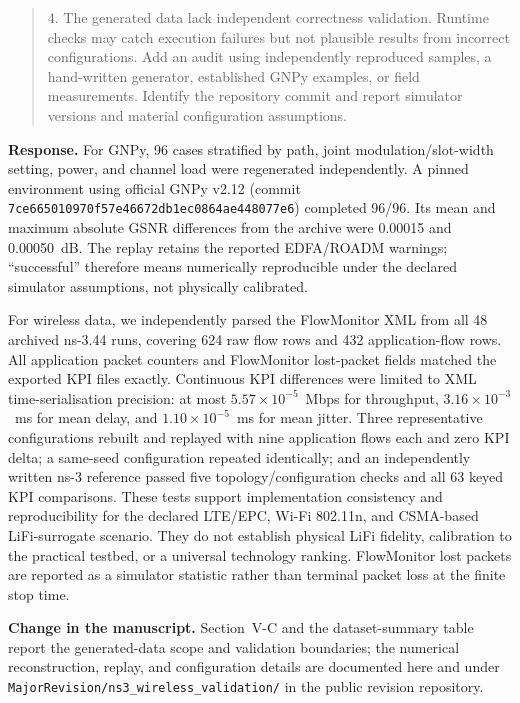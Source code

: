 \documentclass[11pt]{article}
\newenvironment{reviewercomment}{\begin{quote}\color{reviewblue}}{\end{quote}}
\newenvironment{authorresponse}{\color{responsegreen}\textbf{Response.} }{\par\color{black}}
\newcommand{\change}[1]{\par\textbf{Change in the manuscript.} #1\par}
\begin{document}
\begin{reviewercomment}
4. The generated data lack independent correctness validation. Runtime checks may catch execution failures but not plausible results from incorrect configurations. Add an audit using independently reproduced samples, a hand-written generator, established GNPy examples, or field measurements. Identify the repository commit and report simulator versions and material configuration assumptions.
\end{reviewercomment}
\begin{authorresponse}
For GNPy, 96 cases stratified by path, joint modulation/slot-width setting, power, and channel load were regenerated independently. A pinned environment using official GNPy v2.12 (commit \texttt{7ce66501\allowbreak{}0970f57e\allowbreak{}46672db1\allowbreak{}ec0864ae\allowbreak{}448077e6}) completed 96/96. Its mean and maximum absolute GSNR differences from the archive were 0.00015 and 0.00050~dB. The replay retains the reported EDFA/ROADM warnings; ``successful'' therefore means numerically reproducible under the declared simulator assumptions, not physically calibrated.

For wireless data, we independently parsed the FlowMonitor XML from all 48 archived ns-3.44 runs, covering 624 raw flow rows and 432 application-flow rows. All application packet counters and FlowMonitor lost-packet fields matched the exported KPI files exactly. Continuous KPI differences were limited to XML time-serialisation precision: at most $5.57\times10^{-5}$~Mbps for throughput, $3.16\times10^{-3}$~ms for mean delay, and $1.10\times10^{-5}$~ms for mean jitter. Three representative configurations rebuilt and replayed with nine application flows each and zero KPI delta; a same-seed configuration repeated identically; and an independently written ns-3 reference passed five topology/configuration checks and all 63 keyed KPI comparisons. These tests support implementation consistency and reproducibility for the declared LTE/EPC, Wi-Fi 802.11n, and CSMA-based LiFi-surrogate scenario. They do not establish physical LiFi fidelity, calibration to the practical testbed, or a universal technology ranking. FlowMonitor lost packets are reported as a simulator statistic rather than terminal packet loss at the finite stop time.
\end{authorresponse}
\change{Section~V-C and the dataset-summary table report the generated-data scope and validation boundaries; the numerical reconstruction, replay, and configuration details are documented here and under \texttt{MajorRevision/ns3\_wireless\_validation/} in the public revision repository.}
\end{document}
